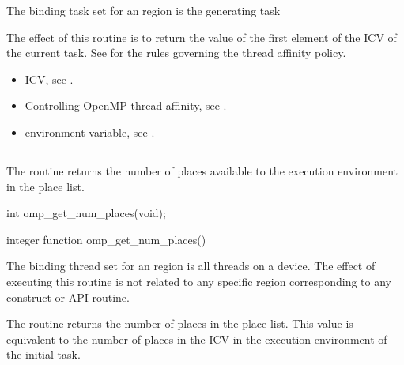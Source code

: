\binding
The binding task set for an  region is the generating task

\effect
The effect of this routine is to return the value of the first element of the  ICV 
of the current task. See  
for the rules governing the thread affinity policy.

\crossreferences
\begin{itemize}
\item {} ICV, see 
.

\item Controlling OpenMP thread affinity, see 
. 

\item {} environment variable, see 
.
\end{itemize}




\subsection{}
\label{subsec:omp_get_num_places}
\summary
The  routine returns the number of places 
available to the execution environment in the place list.

\format
\ccppspecificstart
\begin{boxedcode}
int omp\_get\_num\_places(void);
\end{boxedcode}
\ccppspecificend

\fortranspecificstart
\begin{boxedcode}
integer function omp\_get\_num\_places()
\end{boxedcode}
\fortranspecificend

\binding
The binding thread set for an   region is all threads on a device. The effect of executing this routine is not related to any specific region corresponding to any construct or API routine.

\effect

The  routine returns the number of places in the place list. This value is equivalent to the number of places in the   ICV in the execution environment of the initial task.


